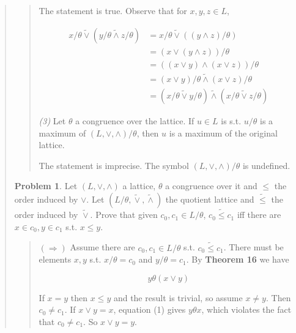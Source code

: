 \documentclass[a4paper, 12pt]{article}
\theoremstyle{definition}
\newtheorem{problem}{Problem}
\theoremstyle{definition}
\theoremstyle{definition}
\begin{document}
\begin{quote}
\begin{quote}
The statement is true. Observe that for $x, y, z \in L$,

\begin{align*}
    x / \theta \widetilde{ \lor  } (y / \theta \widetilde{ \land  } z / \theta) &= x / \theta \widetilde{ \lor  } \left( \left( y \land  z \right) / \theta    \right)  \\ 
    &= \left( x \lor \left( y \land  z \right)  \right) /\theta \\ 
    &= \left( \left( x \lor  y \right) \land \left( x \lor  z \right)   \right) /\theta \\ 
    &=\left( x \lor  y \right) / \theta \widetilde{ \land  } \left( x \lor  z \right) / \theta \\ 
    &= \left( x /\theta \widetilde{ \lor  } y / \theta \right)  \widetilde{ \land  } \left( x / \theta  \widetilde{  \lor  } z / \theta\right) 
\end{align*}



\textit{(3)} Let $\theta$ a congruence over the lattice. If $u \in L$
is s.t. $u / \theta$ is a maximum of $(L, \lor , \land ) / \theta$,
then $u$ is a maximum of the original lattice.

The statement is imprecise. The symbol $(L, \lor , \land ) / \theta$
is undefined.


\end{quote}
\normalsize

\begin{problem}
    Let $(L, \lor , \land )$ a lattice, $\theta$ a congruence over it and 
    $\leq$ the order induced by $\lor $. Let $(L / \theta, \widetilde{\lor}, \widetilde{\land})$ the quotient lattice and $\widetilde{ \leq } $ the order induced by 
    $\widetilde{ \lor  } $. Prove that given $c_0, c_1 \in L / \theta$, 
    $c_0 \widetilde{ \leq }  c_1$ iff there are $x \in c_0, y \in c_1$ s.t. $x \leq y$.
\end{problem}


\small
\begin{quote}

$(\Rightarrow)$ Assume there are $c_0, c_1 \in L / \theta$ s.t. $c_0
\widetilde{ \leq } c_1 $. There must be elements $x, y$
s.t. $x / \theta = c_0$ and $y / \theta = c_1$.
By \textbf{Theorem 16} we have 

\begin{equation}
    y\theta(x \lor  y)
\end{equation}

If $x = y$ then $x \leq y$ and the result is trivial, so assume $x \neq y$.
Then $c_0 \neq c_1$.  If $x \lor  y = x$, equation (1) gives $y \theta x$,
which violates the fact that $c_0 \neq c_1$. So $x \lor  y = y$. 


\end{quote}
\end{quote}
\end{document}
